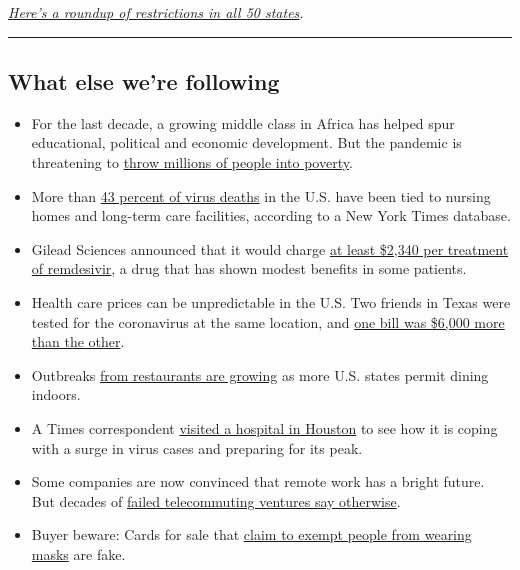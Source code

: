 \href{https://www.nytimes3xbfgragh.onion/interactive/2020/us/states-reopen-map-coronavirus.html}{\emph{Here's
a roundup of restrictions in all 50 states}}\emph{.}

\begin{center}\rule{0.5\linewidth}{\linethickness}\end{center}

\hypertarget{what-else-were-following}{%
\subsection{What else we're following}\label{what-else-were-following}}

\begin{itemize}
\item
  For the last decade, a growing middle class in Africa has helped spur
  educational, political and economic development. But the pandemic is
  threatening to
  \href{https://www.nytimes3xbfgragh.onion/2020/06/29/world/africa/Africa-middle-class-coronavirus.html}{throw
  millions of people into poverty}.
\item
  More than
  \href{https://www.nytimes3xbfgragh.onion/interactive/2020/us/coronavirus-nursing-homes.html}{43
  percent of virus deaths} in the U.S. have been tied to nursing homes
  and long-term care facilities, according to a New York Times database.
\item
  Gilead Sciences announced that it would charge
  \href{https://www.nytimes3xbfgragh.onion/2020/06/29/world/coronavirus-updates.html\#link-3789537d}{at
  least \$2,340 per treatment of remdesivir}, a drug that has shown
  modest benefits in some patients.
\item
  Health care prices can be unpredictable in the U.S. Two friends in
  Texas were tested for the coronavirus at the same location, and
  \href{https://www.nytimes3xbfgragh.onion/2020/06/29/upshot/coronavirus-tests-unpredictable-prices.html?action=click\&module=Top\%20Stories\&pgtype=Homepage}{one
  bill was \$6,000 more than the other}.
\item
  Outbreaks
  \href{https://www.nytimes3xbfgragh.onion/2020/06/28/world/coronavirus-updates.html\#link-212c33ba}{from
  restaurants are growing} as more U.S. states permit dining indoors.
\item
  A Times correspondent
  \href{https://www.nytimes3xbfgragh.onion/2020/06/28/us/coronavirus-hospital-houston.html}{visited
  a hospital in Houston} to see how it is coping with a surge in virus
  cases and preparing for its peak.
\item
  Some companies are now convinced that remote work has a bright future.
  But decades of
  \href{https://www.nytimes3xbfgragh.onion/2020/06/29/technology/working-from-home-failure.html}{failed
  telecommuting ventures say otherwise}.
\item
  Buyer beware: Cards for sale that
  \href{https://www.nytimes3xbfgragh.onion/2020/06/28/world/coronavirus-updates.html\#link-6f2f6d9a}{claim
  to exempt people from wearing masks} are fake.
\end{itemize}

